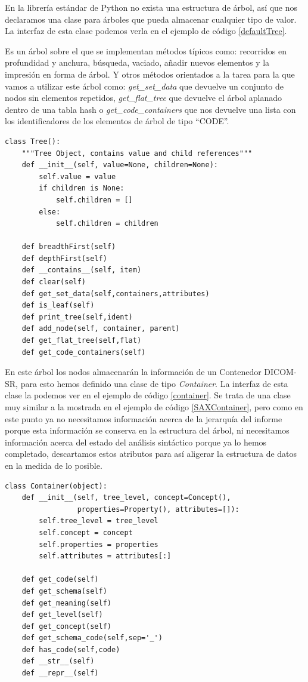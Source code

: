 En la librería estándar de Python no exista una estructura de árbol, así que nos declaramos una clase para árboles que pueda almacenar cualquier tipo de valor. La interfaz de esta clase podemos verla en el ejemplo de código \ref{defaultTree}.\par
Es un árbol sobre el que se implementan métodos típicos como: recorridos en profundidad y anchura, búsqueda, vaciado, añadir nuevos elementos y la impresión en forma de árbol. Y otros métodos orientados a la tarea para la que vamos a utilizar este árbol como: \emph{get\_set\_data} que devuelve un conjunto de nodos sin elementos repetidos, \emph{get\_flat\_tree} que devuelve el árbol aplanado dentro de una tabla hash o \emph{get\_code\_containers} que nos devuelve una lista con los identificadores de los elementos de árbol de tipo ``CODE''.\par 

\begin{lstlisting}[label=defaultTree,caption=Clase para árboles genéricos]
class Tree():
    """Tree Object, contains value and child references"""
    def __init__(self, value=None, children=None):
        self.value = value
        if children is None:
            self.children = []
        else:
            self.children = children

    def breadthFirst(self)
    def depthFirst(self)
    def __contains__(self, item)
    def clear(self)
    def get_set_data(self,containers,attributes)
    def is_leaf(self)
    def print_tree(self,ident)
    def add_node(self, container, parent)
    def get_flat_tree(self,flat)
    def get_code_containers(self)
\end{lstlisting}

En este árbol los nodos almacenarán la información de un Contenedor DICOM-SR, para esto hemos definido una clase de tipo \emph{Container}. La interfaz de esta clase la podemos ver en el ejemplo de código \ref{container}. Se trata de una clase muy similar a la mostrada en el ejemplo de código \ref{SAXContainer}, pero como en este punto ya no necesitamos información acerca de la jerarquía del informe porque esta información se conserva en la estructura del árbol, ni necesitamos información acerca del estado del análisis sintáctico porque ya lo hemos completado, descartamos estos atributos para así aligerar la estructura de datos en la medida de lo posible.\par

\begin{lstlisting}[label=container,caption=Clase para contenedores DICOM-SR]
class Container(object):
    def __init__(self, tree_level, concept=Concept(), 
    			 properties=Property(), attributes=[]):
        self.tree_level = tree_level
        self.concept = concept
        self.properties = properties
        self.attributes = attributes[:]

    def get_code(self)
    def get_schema(self)
    def get_meaning(self)
    def get_level(self)
    def get_concept(self)
    def get_schema_code(self,sep='_')
    def has_code(self,code)
    def __str__(self)
    def __repr__(self)
\end{lstlisting}

